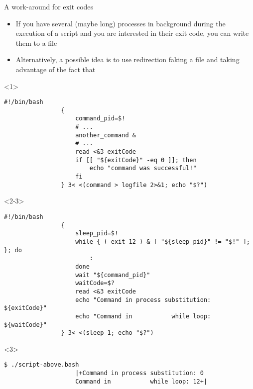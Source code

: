 \begin{frame}[fragile]{A work-around for exit codes}
    \vspace{-4mm}
    \begin{overlayarea}{\textwidth}{\textheight}
        \begin{itemize}
            \item If you have several (maybe long) processes in background during the execution of a script and you are interested in their exit code, you can write them to a file
            \item Alternatively, a possible idea is to use redirection faking a file and taking advantage of the fact that 
        \end{itemize}
        \begin{onlyenv}<1>
            \begin{lstlisting}[style=MyBash, emph={[7]command_pid, exitCode}, emph={[8]another_command}]
                #!/bin/bash
                {
                    command_pid=$!
                    # ...
                    another_command &
                    # ...
                    read <&3 exitCode
                    if [[ "${exitCode}" -eq 0 ]]; then
                        echo "command was successful!"
                    fi
                } 3< <(command > logfile 2>&1; echo "$?")
            \end{lstlisting}
        \end{onlyenv}
        \begin{onlyenv}<2-3>
            \begin{lstlisting}[style=MyBash, emph={[7]sleep_pid, exitCode, waitCode}]
                #!/bin/bash
                {
                    sleep_pid=$!
                    while { ( exit 12 ) & [ "${sleep_pid}" != "$!" ]; }; do
                        :
                    done
                    wait "${command_pid}"
                    waitCode=$?
                    read <&3 exitCode
                    echo "Command in process substitution: ${exitCode}"
                    echo "Command in           while loop: ${waitCode}"
                } 3< <(sleep 1; echo "$?")
            \end{lstlisting}
            \begin{uncoverenv}<3>
                \begin{lstlisting}[style=MyBash, numbers=none, aboveskip=1mm]
                    $ ./script-above.bash
                    |+Command in process substitution: 0
                    Command in           while loop: 12+|
                \end{lstlisting}
            \end{uncoverenv}
        \end{onlyenv}
    \end{overlayarea}
\end{frame}







